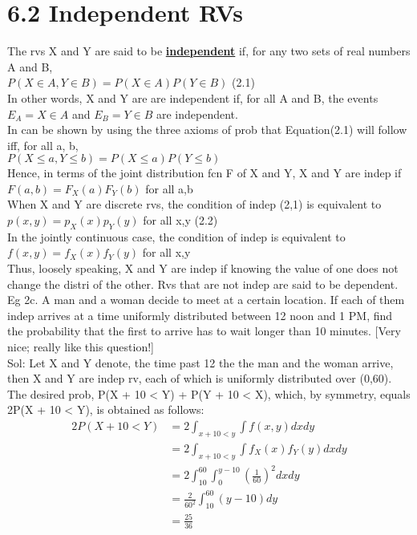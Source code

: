 \documentclass{article}
\begin{document}
\section*{6.2 Independent RVs}
The rvs X and Y are said to be \underline{\textbf{independent}} if, for any two sets of real numbers A and B, \\
$P(X \in A, Y \in B) = P(X \in A)P(Y \in B)$ (2.1) \\ 
In other words, X and Y are are independent if, for all A and B, the events $E_A = {X \in A}$ and $E_B = {Y \in B}$ are independent. \\
In can be shown by using the three axioms of prob that Equation(2.1) will follow iff, for all a, b, \\
$P(X \leq a, Y \leq b) = P(X \leq a)P(Y \leq b)$\\
Hence, in terms of the joint distribution fcn F of X and Y, X and Y are indep if\\
$F(a,b) = F_X(a)F_Y(b)$ for all a,b \\
When X and Y are discrete rvs, the condition of indep (2,1) is equivalent to \\
$p(x,y) = p_X(x)p_Y(y)$ for all x,y (2.2)\\
In the jointly continuous case, the condition of indep is equivalent to \\
$f(x,y) = f_X(x)f_Y(y)$ for all x,y \\
Thus, loosely speaking, X and Y are indep if knowing the value of one does not change the distri of the other. Rvs that are not indep are said to be dependent. \\
Eg 2c. A man and a woman decide to meet at a certain location. If each of them indep arrives at a time uniformly distributed between 12 noon and 1 PM, find the probability that the first to arrive has to wait longer than 10 minutes. [Very nice; really like this question!] \\
Sol: Let X and Y denote, the time past 12 the the man and the woman arrive, then X and Y are indep rv, each of which is uniformly distributed over (0,60). The desired prob, P(X + 10 < Y) + P(Y + 10 < X), which, by symmetry, equals 2P(X + 10 < Y), is obtained as follows: 
\begin{align*}
    2P(X + 10 < Y)  &= 2 \int_{x + 10 < y} \int f(x,y)dxdy \\
                    &= 2 \int_{x + 10 < y} \int f_X(x)f_Y(y)dxdy \\
                    &= 2 \int_{10}^{60} \int_{0}^{y-10} (\frac{1}{60})^2 dxdy \\
                    &= \frac{2}{60^2}\int_{10}^{60}(y-10)dy \\ 
                    &= \frac{25}{36}
\end{align*}
\end{document}

